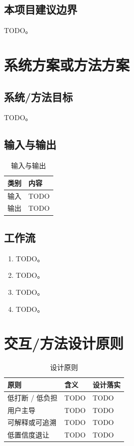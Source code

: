 \documentclass[UTF8,a4paper,11pt]{ctexart}
\begin{document}
\subsection{本项目建议边界}

\begin{tcolorbox}[warnbox,title=需要对审稿人明确的边界]
TODO。
\end{tcolorbox}

\section{系统方案或方法方案}

\subsection{系统/方法目标}

TODO。

\subsection{输入与输出}

\begin{table}[H]
\centering
\caption{输入与输出}
\begin{tabularx}{\textwidth}{p{3cm}X}
\toprule
\textbf{类别} & \textbf{内容} \\
\midrule
输入 & TODO \\
\midrule
输出 & TODO \\
\bottomrule
\end{tabularx}
\end{table}

\subsection{工作流}

\begin{enumerate}[leftmargin=2em]
  \item TODO。
  \item TODO。
  \item TODO。
  \item TODO。
\end{enumerate}

\section{交互/方法设计原则}

\begin{table}[H]
\centering
\caption{设计原则}
\begin{tabularx}{\textwidth}{p{3cm}p{4cm}X}
\toprule
\textbf{原则} & \textbf{含义} & \textbf{设计落实} \\
\midrule
低打断 / 低负担 & TODO & TODO \\
\midrule
用户主导 & TODO & TODO \\
\midrule
可解释或可追溯 & TODO & TODO \\
\midrule
低置信度退让 & TODO & TODO \\
\bottomrule
\end{tabularx}
\end{table}
\end{document}
